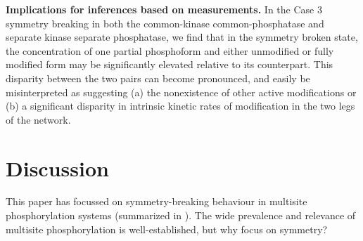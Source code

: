 \documentclass[9pt,lineno]{elife}
\begin{document}
{\bf Implications for inferences based on measurements.} In the Case 3 symmetry breaking in both the common-kinase common-phosphatase and separate kinase separate phosphatase, we find that in the symmetry broken state, the concentration of one partial phosphoform and either unmodified or fully modified form may be significantly elevated relative to its counterpart.
This disparity between the two pairs can become pronounced, and easily be misinterpreted as suggesting (a) the nonexistence of other active modifications or (b) a significant disparity in intrinsic kinetic rates of modification in the two legs of the network.

\section{Discussion}

This paper has focussed on symmetry-breaking behaviour in multisite phosphorylation systems (summarized in ). The wide prevalence and relevance of multisite phosphorylation is well-established, but why focus on symmetry?
\end{document}
